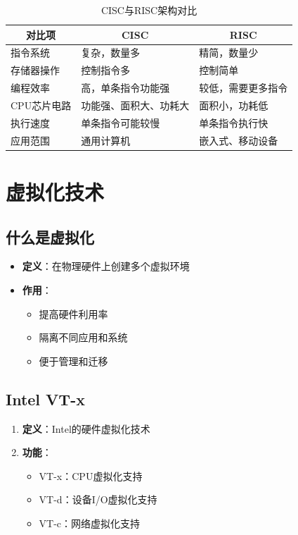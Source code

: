 \documentclass[12pt,UTF8]{ctexbook}
\begin{document}
\begin{table}[H]
    \centering
    \begin{tabularx}{\textwidth}{|p{4cm}|X|X|}
        \hline
        \multicolumn{1}{|c|}{\textbf{对比项}} & \multicolumn{1}{c|}{\textbf{CISC}} & \multicolumn{1}{c|}{\textbf{RISC}} \\
        \hline
        指令系统 & 复杂，数量多 & 精简，数量少 \\
        \hline
        存储器操作 & 控制指令多 & 控制简单 \\
        \hline
        编程效率 & 高，单条指令功能强 & 较低，需要更多指令 \\
        \hline
        CPU芯片电路 & 功能强、面积大、功耗大 & 面积小，功耗低 \\
        \hline
        执行速度 & 单条指令可能较慢 & 单条指令执行快 \\
        \hline
        应用范围 & 通用计算机 & 嵌入式、移动设备 \\
        \hline
    \end{tabularx}
    \caption{CISC与RISC架构对比}
    \label{tab:cisc_vs_risc}
\end{table}

\chapter{虚拟化技术}

\section{什么是虚拟化}

\begin{itemize}[leftmargin=2em]
    \item \textbf{定义}：在物理硬件上创建多个虚拟环境
    \item \textbf{作用}：
    \begin{itemize}
        \item 提高硬件利用率
        \item 隔离不同应用和系统
        \item 便于管理和迁移
    \end{itemize}
\end{itemize}

\section{Intel VT-x}

\begin{enumerate}
    \item \textbf{定义}：Intel的硬件虚拟化技术
    \item \textbf{功能}：
    \begin{itemize}[leftmargin=2em]
        \item VT-x：CPU虚拟化支持
        \item VT-d：设备I/O虚拟化支持
        \item VT-c：网络虚拟化支持
    \end{itemize}
\end{enumerate}
\end{document}
